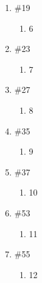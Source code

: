 \documentclass[12pt]{article}
\begin{document}
\begin{enumerate}
  \item \#19 \begin{enumerate}

      \item 6
      
        \end{enumerate}

    \item \#23 \begin{enumerate}

        \item 7

      \end{enumerate}

    \item \#27 \begin{enumerate}

        \item 8 

      \end{enumerate}

    \item \#35 \begin{enumerate}

        \item 9

      \end{enumerate}

    \item \#37 \begin{enumerate}

        \item 10

      \end{enumerate}

	\item \#53 \begin{enumerate}
	
		\item 11
	
	\end{enumerate}
	
	\item \#55 \begin{enumerate}
	
		\item 12
	
	\end{enumerate}
	
\end{enumerate}
\end{document}
